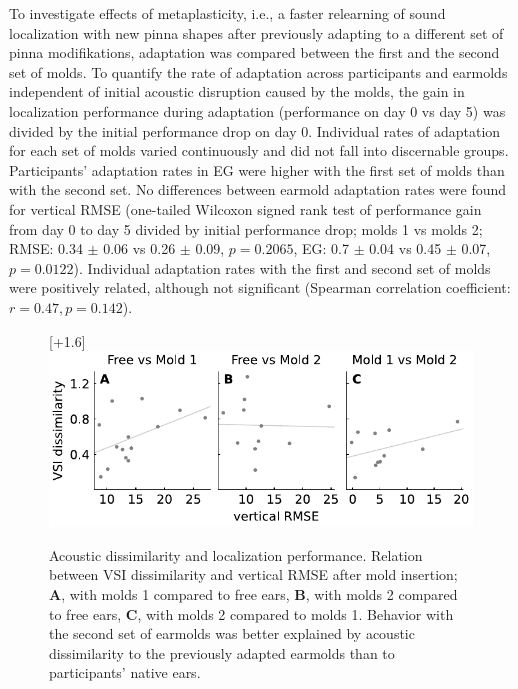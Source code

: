 To investigate effects of metaplasticity, i.e., a faster relearning of sound localization with new pinna shapes after previously adapting to a different set of pinna modifikations, adaptation was compared between the first and the second set of molds. To quantify the rate of adaptation across participants and earmolds independent of initial acoustic disruption caused by the molds, the gain in localization performance during adaptation (performance on day 0 vs day 5) was divided by the initial performance drop on day 0. Individual rates of adaptation for each set of molds varied continuously and did not fall into discernable groups. Participants' adaptation rates in EG were higher with the first set of molds than with the second set. No differences between earmold adaptation rates were found for vertical RMSE (one-tailed Wilcoxon signed rank test of performance gain from day 0 to day 5 divided by initial performance drop; molds 1 vs molds 2; RMSE: 0.34 $\pm$ 0.06 vs 0.26 $\pm$ 0.09, $p = 0.2065$, EG: 0.7 $\pm$ 0.04 vs 0.45 $\pm$ 0.07, $p = 0.0122$). Individual adaptation rates with the first and second set of molds were positively related, although not significant (Spearman correlation coefficient: $r = 0.47, p = 0.142$). 

 \begin{figure}
\centering
    \raisebox{0pt}[\dimexpr\height+1.6\baselineskip\relax]{
        \includegraphics[width=12cm]{../Results/figures/fig6/fig6}}
	\caption{Acoustic dissimilarity and localization performance. Relation between VSI dissimilarity and vertical RMSE after mold insertion; \textbf{A}, with molds 1 compared to free ears, \textbf{B}, with molds 2 compared to free ears, \textbf{C}, with molds 2 compared to molds 1. Behavior with the second set of earmolds was better explained by acoustic dissimilarity to the previously adapted earmolds than to participants' native ears.}
	\label{fig:vsi_dis_rmse}
\end{figure}
\noindent%

